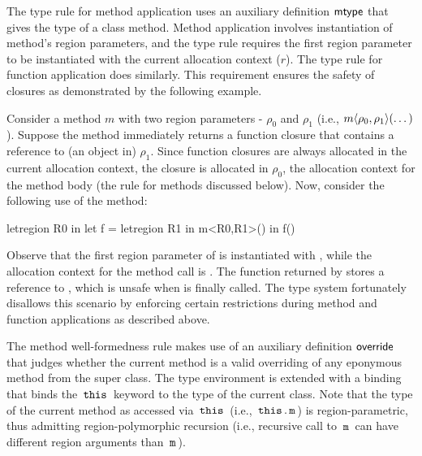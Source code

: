 The type rule for method application uses an auxiliary definition
${\sf mtype}$ that gives the type of a class method. Method application
involves instantiation of method's region parameters, and the type
rule requires the first region parameter to be instantiated with the
current allocation context ($r$). The type rule for function
application does similarly.  This requirement ensures the safety of
closures as demonstrated by the following example.

Consider a method $m$ with two region parameters - $\rho_0$ and
$\rho_1$ (i.e., $m\langle \rho_0,\rho_1 \rangle(\dots)$). Suppose the method
immediately returns a function closure that contains a reference to
(an object in) $\rho_1$. Since function closures are always allocated
in the current allocation context, the closure is allocated in
$\rho_0$, the allocation context for the method body (the rule for
methods discussed below). Now, consider the following use of the
method:
\begin{codejava}
letregion R0 in
  let f = letregion R1 in m<R0,R1>()
  in f()
\end{codejava}
Observe that the first region parameter of  is instantiated with
, while the allocation context for the method call is .
The function  returned by  stores a reference to ,
which is unsafe when  is finally called. The type system
fortunately disallows this scenario by enforcing certain restrictions
during method and function applications as described above.


The method well-formedness rule makes use of an auxiliary definition
${\sf override}$ that judges whether the current method is a valid
overriding of any eponymous method from the super class. The type
environment is extended with a binding that binds the $\,{\tt this}\,$ keyword
to the type of the current class. Note that the type of the
current method as accessed via $\,{\tt this}\,$ (i.e., $\,{\tt this}\,.\,{\tt m}\,$) is
region-parametric, thus admitting region-polymorphic recursion (i.e.,
recursive call to $\,{\tt m}\,$ can have different region arguments than
$\,{\tt m}\,$). 

